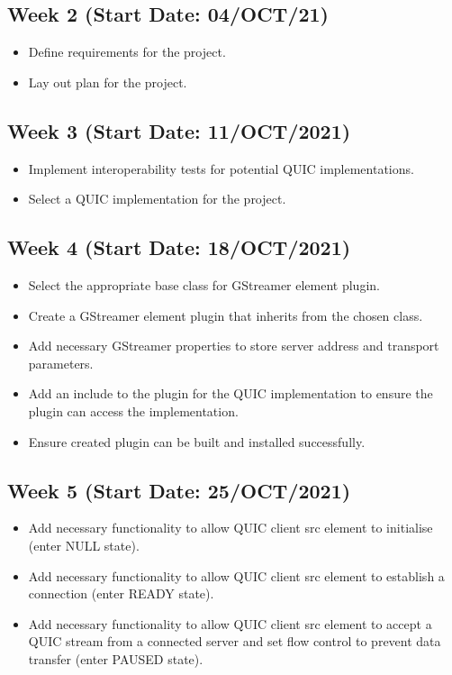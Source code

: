 \documentclass[11pt]{article}
\begin{document}
\subsection{Week 2 (Start Date: 04/OCT/21)}
\begin{itemize}
    \item Define requirements for the project.
    \item Lay out plan for the project.
\end{itemize}
\subsection{Week 3 (Start Date: 11/OCT/2021)}
\begin{itemize}
    \item Implement interoperability tests for potential QUIC implementations.
    \item Select a QUIC implementation for the project.
\end{itemize}
\subsection{Week 4 (Start Date: 18/OCT/2021)}
\begin{itemize}
    \item Select the appropriate base class for GStreamer element plugin.
    \item Create a GStreamer element plugin that inherits from the chosen class.
    \item Add necessary GStreamer properties to store server address and transport parameters.
    \item Add an include to the plugin for the QUIC implementation to ensure the plugin can access the implementation.
    \item Ensure created plugin can be built and installed successfully.
\end{itemize}
\subsection{Week 5 (Start Date: 25/OCT/2021)}
\begin{itemize}
    \item Add necessary functionality to allow QUIC client src element to initialise (enter NULL state).
    \item Add necessary functionality to allow QUIC client src element to establish a connection (enter READY state).
    \item Add necessary functionality to allow QUIC client src element to accept a QUIC stream from a connected server and set flow control to prevent data transfer (enter PAUSED state).
\end{itemize}
\end{document}
